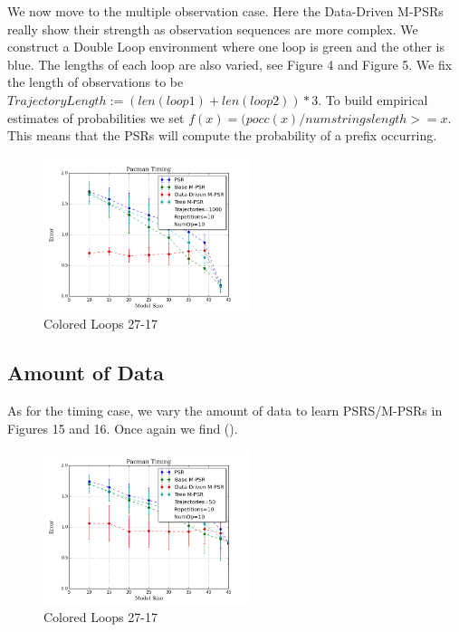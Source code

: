 We now move to the multiple observation case. Here the Data-Driven M-PSRs really show their strength as observation sequences are more complex. We construct a Double Loop environment where one loop is green and the other is blue. The lengths of each loop are also varied, see Figure 4 and Figure 5. We fix the length of observations to be $TrajectoryLength := (len(loop1) + len(loop2))*3$. To build empirical estimates of probabilities we set $f(x)=(pocc(x)/numstringslength>=x$. This means that the PSRs will compute the probability of a prefix occurring.

\begin{figure}[ht!]
\centering
\includegraphics[width=60mm]{uCOREPICS/DLMO/MO_1k.png}
\caption{Colored Loops 27-17\label{overflow}}
\end{figure}


\subsection{Amount of Data}

As for the timing case, we vary the amount of data to learn PSRS/M-PSRs in Figures 15 and 16. Once again we find ().

\begin{figure}[ht!]
\centering
\includegraphics[width=60mm]{uCOREPICS/DLMO/MO_50.png}
\caption{Colored Loops 27-17\label{overflow}}
\end{figure}

